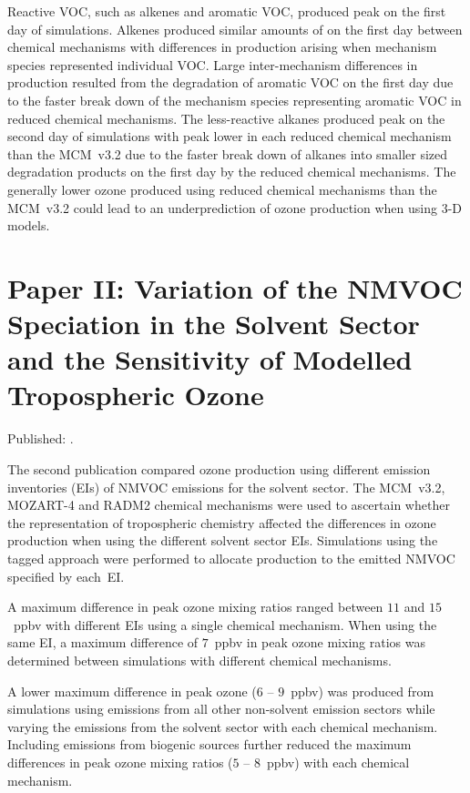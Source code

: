 Reactive VOC, such as alkenes and aromatic VOC, produced peak  on the first day of simulations.
Alkenes produced similar amounts of  on the first day between chemical mechanisms with differences in  production arising when mechanism species represented individual VOC.
Large inter-mechanism differences in  production resulted from the degradation of aromatic VOC on the first day due to the faster break down of the mechanism species representing aromatic VOC in reduced chemical mechanisms.
The less-reactive alkanes produced peak  on the second day of simulations with peak  lower in each reduced chemical mechanism than the MCM~v3.2 due to the faster break down of alkanes into smaller sized degradation products on the first day by the reduced chemical mechanisms.
The generally lower ozone produced using reduced chemical mechanisms than the MCM~v3.2 could lead to an underprediction of ozone production when using 3-D models.

\newpage
\singlespacing
\section{Paper II: Variation of the NMVOC Speciation in the Solvent Sector and the Sensitivity of Modelled Tropospheric Ozone} \label{s:EI_results}
\onehalfspacing

\vspace{-6mm}
\noindent
Published: .
\vspace{5mm}

The second publication compared ozone production using different emission inventories (EIs) of NMVOC emissions for the solvent sector.
The MCM~v3.2, MOZART-4 and RADM2 chemical mechanisms were used to ascertain whether the representation of tropospheric chemistry affected the differences in ozone production when using the different solvent sector EIs.
Simulations using the tagged approach were performed to allocate  production to the emitted NMVOC specified by each~EI.

A maximum difference in peak ozone mixing ratios ranged between $11$ and $15$~ppbv with different EIs using a single chemical mechanism.
When using the same EI, a maximum difference of $7$~ppbv in peak ozone mixing ratios was determined between simulations with different chemical mechanisms.

A lower maximum difference in peak ozone ($6$ -- $9$~ppbv) was produced from simulations using emissions from all other non-solvent emission sectors while varying the emissions from the solvent sector with each chemical mechanism.
Including emissions from biogenic sources further reduced the maximum differences in peak ozone mixing ratios ($5$ -- $8$~ppbv) with each chemical mechanism.

